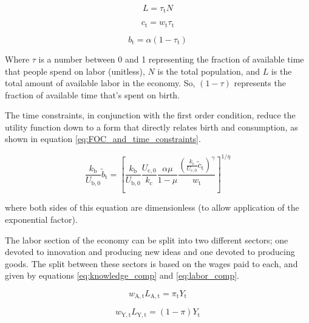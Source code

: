 \documentclass[letterpaper,12pt]{article}
\begin{document}
\begin{equation}\label{eq:pop_work}
	L = \tau_\mathrm{t} N
\end{equation}

\begin{equation} \label{eq:consumption_constraint}
	c_\mathrm{t} = w_\mathrm{t} \tau_\mathrm{t}
\end{equation}

\begin{equation} \label{eq:birth_constraint}
	b_\mathrm{t} = \alpha (1-\tau_\mathrm{t})
\end{equation}

Where $\tau$ is a number between 0 and 1 representing the fraction of available time that people spend on labor (unitless), $N$ is the total population, and $L$ is the total amount of available labor in the economy. So, $(1-\tau)$ represents the fraction of available time that's spent on birth.

The time constraints, in conjunction with the first order condition, reduce the utility function down to a form that directly relates birth and consumption, as shown in equation \ref{eq:FOC_and_time_constraints}.

\begin{equation} \label{eq:FOC_and_time_constraints}
	\frac{k_\mathrm{b}}{U_\mathrm{b,0}} \tilde b_\mathrm{t} = \left[ \frac{k_\mathrm{b}}{U_\mathrm{b,0}} \frac{U_\mathrm{c,0}}{k_\mathrm{c}} \frac{\alpha \mu}{1-\mu} \frac{( \frac{k_\mathrm{c}}{U_\mathrm{c,0}} \tilde c_\mathrm{t} )^\gamma}{w_\mathrm{t}}\right]^{1/\eta}
\end{equation}

\noindent where both sides of this equation are dimensionless (to allow application of the exponential factor).

The labor section of the economy can be split into two different sectors; one devoted to innovation and producing new ideas and one devoted to producing goods. The split between these sectors is based on the wages paid to each, and given by equations \ref{eq:knowledge_comp} and \ref{eq:labor_comp}.

\begin{equation} \label{eq:knowledge_comp}
	w_\mathrm{A,t} L_\mathrm{A,t} = \pi_\mathrm{t} Y_\mathrm{t}
\end{equation}

\begin{equation} \label{eq:labor_comp}
	w_\mathrm{Y,t} L_\mathrm{Y,t} = (1-\pi) Y_\mathrm{t}
\end{equation}
\end{document}
